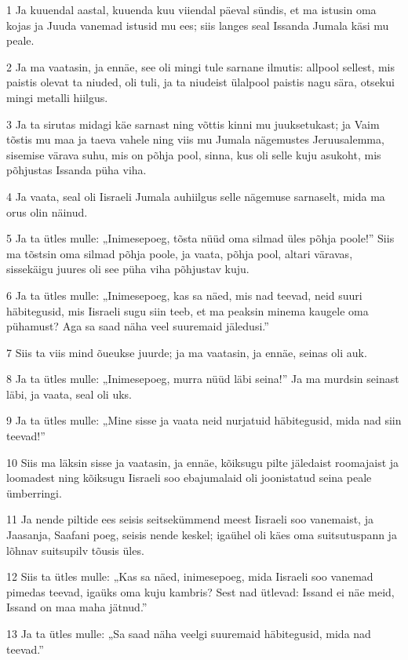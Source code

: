 \par 1 Ja kuuendal aastal, kuuenda kuu viiendal päeval sündis, et ma istusin oma kojas ja Juuda vanemad istusid mu ees; siis langes seal Issanda Jumala käsi mu peale.
\par 2 Ja ma vaatasin, ja ennäe, see oli mingi tule sarnane ilmutis: allpool sellest, mis paistis olevat ta niuded, oli tuli, ja ta niudeist ülalpool paistis nagu sära, otsekui mingi metalli hiilgus.
\par 3 Ja ta sirutas midagi käe sarnast ning võttis kinni mu juuksetukast; ja Vaim tõstis mu maa ja taeva vahele ning viis mu Jumala nägemustes Jeruusalemma, sisemise värava suhu, mis on põhja pool, sinna, kus oli selle kuju asukoht, mis põhjustas Issanda püha viha.
\par 4 Ja vaata, seal oli Iisraeli Jumala auhiilgus selle nägemuse sarnaselt, mida ma orus olin näinud.
\par 5 Ja ta ütles mulle: „Inimesepoeg, tõsta nüüd oma silmad üles põhja poole!” Siis ma tõstsin oma silmad põhja poole, ja vaata, põhja pool, altari väravas, sissekäigu juures oli see püha viha põhjustav kuju.
\par 6 Ja ta ütles mulle: „Inimesepoeg, kas sa näed, mis nad teevad, neid suuri häbitegusid, mis Iisraeli sugu siin teeb, et ma peaksin minema kaugele oma pühamust? Aga sa saad näha veel suuremaid jäledusi.”
\par 7 Siis ta viis mind õueukse juurde; ja ma vaatasin, ja ennäe, seinas oli auk.
\par 8 Ja ta ütles mulle: „Inimesepoeg, murra nüüd läbi seina!” Ja ma murdsin seinast läbi, ja vaata, seal oli uks.
\par 9 Ja ta ütles mulle: „Mine sisse ja vaata neid nurjatuid häbitegusid, mida nad siin teevad!”
\par 10 Siis ma läksin sisse ja vaatasin, ja ennäe, kõiksugu pilte jäledaist roomajaist ja loomadest ning kõiksugu Iisraeli soo ebajumalaid oli joonistatud seina peale ümberringi.
\par 11 Ja nende piltide ees seisis seitsekümmend meest Iisraeli soo vanemaist, ja Jaasanja, Saafani poeg, seisis nende keskel; igaühel oli käes oma suitsutuspann ja lõhnav suitsupilv tõusis üles.
\par 12 Siis ta ütles mulle: „Kas sa näed, inimesepoeg, mida Iisraeli soo vanemad pimedas teevad, igaüks oma kuju kambris? Sest nad ütlevad: Issand ei näe meid, Issand on maa maha jätnud.”
\par 13 Ja ta ütles mulle: „Sa saad näha veelgi suuremaid häbitegusid, mida nad teevad.”
